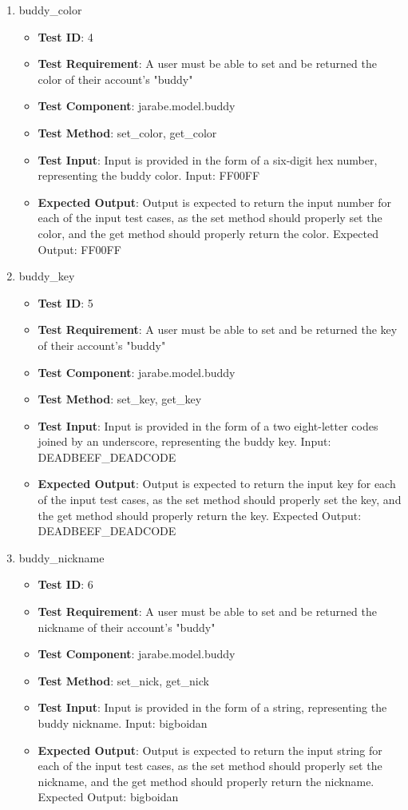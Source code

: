 \documentclass{article}
\begin{document}
\begin{enumerate}[noitemsep]
\begin{itemize}[noitemsep,topsep=0pt]
\end{itemize}
\item buddy\_color
\begin{itemize}[noitemsep,topsep=0pt]
\item \textbf{Test ID}: 4
\item \textbf{Test Requirement}: A user must be able to set and be returned the color of their account's "buddy"
\item \textbf{Test Component}: jarabe.model.buddy
\item \textbf{Test Method}: set\_color, get\_color
\item \textbf{Test Input}: Input is provided in the form of a six-digit hex number, representing the buddy color. Input: FF00FF
\item \textbf{Expected Output}: Output is expected to return the input number for each of the input test cases, as the set method should properly set the color, and the get method should properly return the color. Expected Output: FF00FF
\end{itemize}
\item buddy\_key
\begin{itemize}[noitemsep,topsep=0pt]
\item \textbf{Test ID}: 5
\item \textbf{Test Requirement}: A user must be able to set and be returned the key of their account's "buddy"
\item \textbf{Test Component}: jarabe.model.buddy
\item \textbf{Test Method}: set\_key, get\_key
\item \textbf{Test Input}: Input is provided in the form of a two eight-letter codes joined by an underscore, representing the buddy key. Input: DEADBEEF\_DEADCODE
\item \textbf{Expected Output}: Output is expected to return the input key for each of the input test cases, as the set method should properly set the key, and the get method should properly return the key. Expected Output: DEADBEEF\_DEADCODE
\end{itemize}
\item buddy\_nickname
\begin{itemize}[noitemsep,topsep=0pt]
\item \textbf{Test ID}: 6
\item \textbf{Test Requirement}: A user must be able to set and be returned the nickname of their account's "buddy"
\item \textbf{Test Component}: jarabe.model.buddy
\item \textbf{Test Method}: set\_nick, get\_nick
\item \textbf{Test Input}: Input is provided in the form of a string, representing the buddy nickname. Input: bigboidan
\item \textbf{Expected Output}: Output is expected to return the input string for each of the input test cases, as the set method should properly set the nickname, and the get method should properly return the nickname. Expected Output: bigboidan
\end{itemize}
\end{enumerate}
\end{document}
